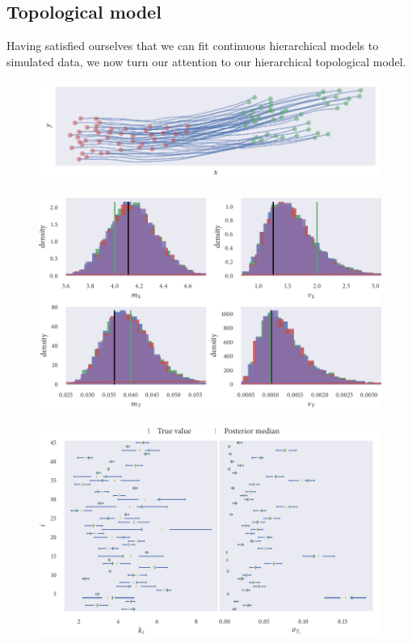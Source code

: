 \subsection{Topological model}

Having satisfied ourselves that we can fit continuous hierarchical models to
simulated data, we now turn our attention to our hierarchical topological
model. 

\begin{figure}[tbp]
  \includegraphics{top_hier_sim.pdf}
  \caption{} 
\end{figure}
\begin{figure}[tbp]
  \includegraphics{top_hier_hist.pdf}
  \caption{} 
\end{figure}
\begin{figure}[tbp]
  \includegraphics{top_hier_summary.pdf}
  \caption{} 
\end{figure}

